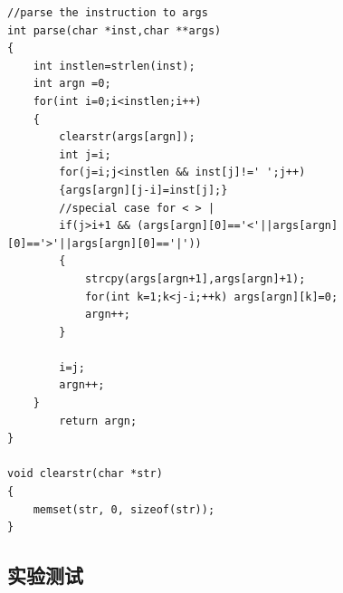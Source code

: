 \documentclass{article}
\begin{document}
\begin{lstlisting}[language={[ANSI]C}]
//parse the instruction to args
int parse(char *inst,char **args)
{
	int instlen=strlen(inst);
	int argn =0;
	for(int i=0;i<instlen;i++)
	{
		clearstr(args[argn]);
		int j=i;
		for(j=i;j<instlen && inst[j]!=' ';j++)
		{args[argn][j-i]=inst[j];}
		//special case for < > |
		if(j>i+1 && (args[argn][0]=='<'||args[argn][0]=='>'||args[argn][0]=='|'))
		{
			strcpy(args[argn+1],args[argn]+1);
			for(int k=1;k<j-i;++k) args[argn][k]=0;
			argn++;
		}
		
		i=j;
		argn++;
	}
		return argn;
}

void clearstr(char *str)
{
	memset(str, 0, sizeof(str));
}
\end{lstlisting}
\subsection{实验测试}
\end{document}
